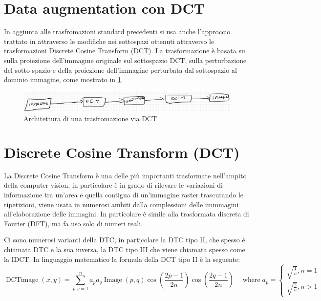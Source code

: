 \section{Data augmentation con DCT}\label{data-augmentation-con-dct}

In aggiunta alle trasfromazioni standard precedenti si usa anche l'approccio trattato in \cite{nanni_dtc_pca} attraverso le modifiche nei sottospazi ottenuti attraverso le trasformazioni Discrete Cosine
Transform (DCT). La trasformazione è basata su
sulla proiezione dell'immagine originale sul sottospazio DCT, sulla perturbazione del sotto spazio e della proiezione dell'immagine perturbata dal sottospazio al dominio immagine, come mostrato in \cref{fig:dct-schema}.

\begin{figure}[ht]
    \centering
    \includegraphics[width=1\textwidth]{data-augmentation/dct-trasformazione.PNG}
    \caption{Architettura di una trasfromazione via DCT}
    \label{fig:dct-schema}
\end{figure}


\section{Discrete Cosine Transform (DCT)}\label{discrete-cosine-transform-dct}


La Discrete Cosine Transform è una delle più importanti trasformate nell'ampito della computer vision, in particolare è in grado di rilevare le  variazioni di informazione tra un'area e quella contigua di un'immagine raster trascurando le ripetizioni, viene usata in numerosi ambiti dalla complessioni delle immmagini all'elaborazione delle immagini. In particolare è simile alla  trasformata discreta di Fourier (DFT), ma fa uso solo di numeri reali\cite{syed_dct}.

Ci sono numerosi varianti della DTC, in particolare la DTC tipo II, che spesso è chiamata DTC e la sua inversa, la DTC tipo III che viene chiamata spesso come la IDCT. In linguaggio matematico la formula della DCT tipo II è la seguente\cite{syed_dct}\cite{nanni_dtc_pca}:
\[\operatorname{DCTimage} ( x , y ) = \sum _ { p , q = 1 } ^ { n } a _ { p } a _ { q } \operatorname { Image } ( p , q ) \cos \left(\frac { 2 p - 1 } { 2 n }\right) \cos \left(\frac { 2 q - 1 } { 2 n }\right) \quad \operatorname{where}  a _ { p } = \left\{ \begin{array} { l } \sqrt { \frac { 1 } { n } } , n = 1 \\ \sqrt { \frac { 2 } { n } } , n > 1 \end{array} \right.\]
